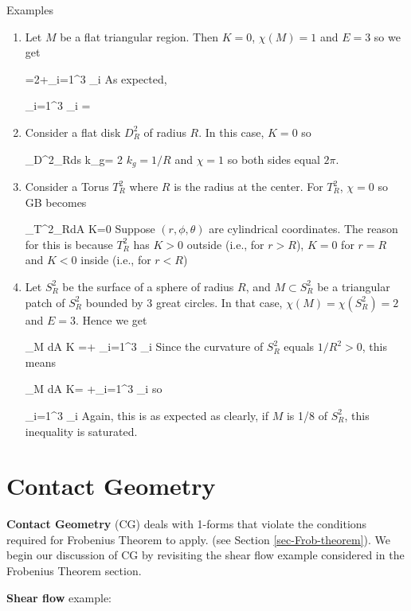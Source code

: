 Examples
\begin{enumerate}
\item Let $M$ be a flat triangular region. Then $K=0$,
$\chi(M)=1$ and $E=3$ so we get

=2\pi +\sum_{i=1}^3 \theta_i
\eeq
As expected,

\beq
\sum_{i=1}^3 \theta_i =\pi
\eeq

\item Consider a flat disk $D^2_R$ of radius $R$.
In this case, $K=0$ so

\beq
\oint_{D^2_R}ds \;k_g= 2\pi\chi
\eeq
$k_g=1/R$
and $\chi=1$ so both sides equal $2\pi$.

\item Consider a Torus $T^2_R$
where $R$ is the radius at the center. 
For $T^2_R$, $\chi=0$ so GB becomes

\beq
\iint_{T^2_R}dA \;K=0
\eeq
Suppose $(r, \phi, \theta)$
are cylindrical coordinates.
The reason for this is because
$T^2_R$ has $K>0$ outside (i.e., for $r>R$),  $K=0$ for $r=R$ and
$K<0$ inside (i.e., for $r<R$)

 
\item Let $S^2_R$ be the surface of a sphere
of radius $R$,
and $M\subset S^2_R$ be a  triangular patch of $S^2_R$ 
 bounded by 3 great circles. In that case,
$\chi(M)=\chi(S^2_R)=2$ and $E=3$. 
Hence we get

\beq
\iint_M dA\; K =\pi + \sum_{i=1}^3
\theta_i
\eeq
Since the curvature of $S^2_R$
equals $1/R^2>0$, this means 

\pi \geq \iint_M dA\; K=
\pi +\sum_{i=1}^3 \theta_i
\eeq
so

\pi \geq \sum_{i=1}^3 \theta_i
\eeq
Again, this is as expected as 
clearly, if $M$ is 1/8
of $S^2_R$, this inequality is 
saturated.

\end{enumerate}


\section{Contact Geometry}
\label{sec-contact-geo}


{\bf Contact Geometry} (CG) deals with 1-forms that violate 
the conditions required for Frobenius Theorem to apply. (see Section \ref{sec-Frob-theorem}).
We begin our discussion of
CG by revisiting the shear flow
example considered in the Frobenius Theorem section.



{\bf Shear flow} example: 

